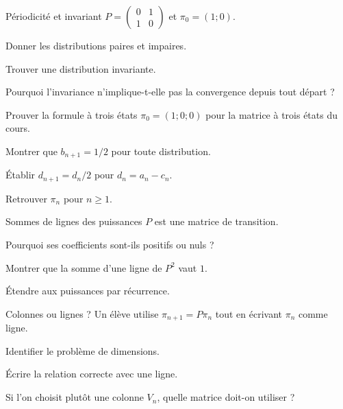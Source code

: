 \begingroup\renewcommand{\otBesoinPlace}[1]{}\begin{minipage}{\linewidth}
\begin{exercice}[3]{Périodicité et invariant}
$P=\begin{pmatrix}0&1\\1&0\end{pmatrix}$ et $\pi_0=(1;0)$.
\begin{questions}
\item Donner les distributions paires et impaires.
\item Trouver une distribution invariante.
\item Pourquoi l’invariance n’implique-t-elle pas la convergence depuis tout départ ?
\end{questions}
\end{exercice}
\begin{exercice}[3]{Prouver la formule à trois états}
$\pi_0=(1;0;0)$ pour la matrice à trois états du cours.
\begin{questions}
\item Montrer que $b_{n+1}=1/2$ pour toute distribution.
\item Établir $d_{n+1}=d_n/2$ pour $d_n=a_n-c_n$.
\item Retrouver $\pi_n$ pour $n\geq1$.
\end{questions}
\end{exercice}
\begin{exercice}[3]{Sommes de lignes des puissances}
$P$ est une matrice de transition.
\begin{questions}
\item Pourquoi ses coefficients sont-ils positifs ou nuls ?
\item Montrer que la somme d’une ligne de $P^2$ vaut $1$.
\item Étendre aux puissances par récurrence.
\end{questions}
\end{exercice}
\begin{exercice}[3]{Colonnes ou lignes ?}
Un élève utilise $\pi_{n+1}=P\pi_n$ tout en écrivant $\pi_n$ comme ligne.
\begin{questions}
\item Identifier le problème de dimensions.
\item Écrire la relation correcte avec une ligne.
\item Si l’on choisit plutôt une colonne $V_n$, quelle matrice doit-on utiliser ?
\end{questions}
\end{exercice}
\end{minipage}\endgroup

